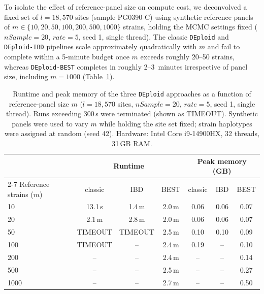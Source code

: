 \documentclass{article}
\begin{document}
To isolate the effect of reference-panel size on compute cost, we deconvolved a
fixed set of $l = 18{,}570$ sites (sample PG0390-C) using synthetic reference
panels of $m \in \{10, 20, 50, 100, 200, 500, 1000\}$ strains, holding the
MCMC settings fixed ($nSample = 20$, $rate = 5$, seed 1, single thread). The
classic {\tt DEploid} and {\tt DEploid-IBD} pipelines scale approximately
quadratically with $m$ and fail to complete within a 5-minute budget once $m$
exceeds roughly 20--50 strains, whereas {\tt DEploid-BEST} completes in roughly
2--3~minutes irrespective of panel size, including $m = 1000$ (Table~\ref{tab:runtime}).

\begin{table}[ht]
\centering
\begin{tabular}{lccc ccc}\hline\hline
  & \multicolumn{3}{c}{Runtime} & \multicolumn{3}{c}{Peak memory (GB)} \\
\cline{2-7}
  Reference strains ($m$) & classic & IBD & BEST & classic & IBD & BEST \\ \hline
  10   & 13.1\,s & 1.4\,m & 2.0\,m & 0.06 & 0.06 & 0.07 \\
  20   & 2.1\,m  & 2.8\,m & 2.0\,m & 0.06 & 0.06 & 0.07 \\
  50   & TIMEOUT & TIMEOUT & 2.5\,m & 0.10 & 0.10 & 0.09 \\
  100  & TIMEOUT & --     & 2.4\,m & 0.19 & --   & 0.10 \\
  200  & --      & --     & 2.4\,m & --   & --   & 0.14 \\
  500  & --      & --     & 2.5\,m & --   & --   & 0.27 \\
  1000 & --      & --     & 2.7\,m & --   & --   & 0.50 \\
\hline
\end{tabular}
\caption{Runtime and peak memory of the three
{\tt DEploid} approaches as a function of reference-panel size $m$
($l = 18{,}570$ sites, $nSample = 20$, $rate = 5$, seed 1, single thread).
Runs exceeding 300\,s were terminated (shown as TIMEOUT). Synthetic panels were
used to vary $m$ while holding the site set fixed; strain haplotypes were
assigned at random (seed 42). Hardware: Intel Core i9-14900HX, 32 threads,
31\,GB RAM.}
\label{tab:runtime}
\end{table}

\end{document}

